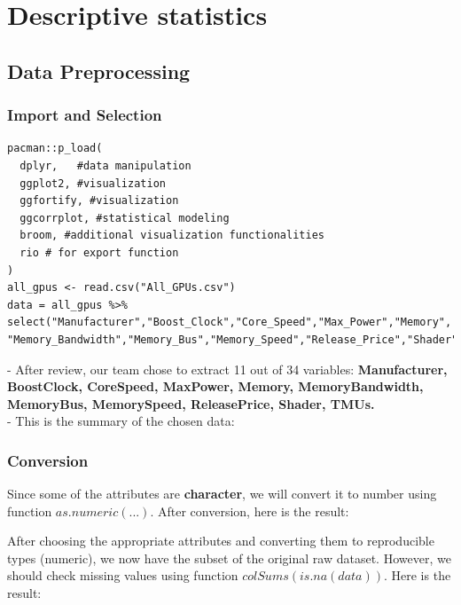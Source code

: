 \documentclass[a4paper]{article}
\theoremstyle{definition}
\begin{document}
\section{Descriptive statistics}
\subsection{Data Preprocessing}
\subsubsection{Import and Selection}
\begin{mdframed}[leftline=false,rightline=false,backgroundcolor=lightblue!10,nobreak=false]
    \begin{verbatim}
pacman::p_load(
  dplyr,   #data manipulation
  ggplot2, #visualization
  ggfortify, #visualization
  ggcorrplot, #statistical modeling
  broom, #additional visualization functionalities
  rio # for export function
)
all_gpus <- read.csv("All_GPUs.csv")
data = all_gpus %>% select("Manufacturer","Boost_Clock","Core_Speed","Max_Power","Memory",
"Memory_Bandwidth","Memory_Bus","Memory_Speed","Release_Price","Shader","TMUs")
    \end{verbatim}
\end{mdframed}
- After review, our team chose to extract 11 out of 34 variables: \textbf{Manufacturer, Boost\textunderscore Clock, Core\textunderscore Speed, Max\textunderscore Power, Memory, Memory\textunderscore Bandwidth, Memory\textunderscore Bus, Memory\textunderscore Speed, Release\textunderscore Price, Shader, TMUs.}\\
- This is the summary of the chosen data:

\subsubsection{Conversion}
Since some of the attributes are \textbf{character}, we will convert it to number using function $as.numeric(...)$. After conversion, here is the result:

After choosing the appropriate attributes and converting them to reproducible types (numeric), we now have the subset of the original raw dataset. However, we should check missing values using function $colSums(is.na(data))$. Here is the result:

\end{document}

